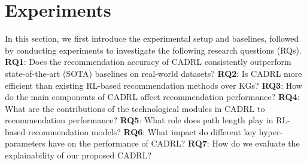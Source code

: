 \documentclass[conference]{IEEEtran}
\begin{document}

\section{Experiments}
In this section, we first introduce the experimental setup and baselines, followed by conducting experiments to investigate the following research questions (RQs). \textbf{RQ1}: Does the recommendation accuracy of CADRL consistently outperform state-of-the-art (SOTA) baselines on real-world datasets? \textbf{RQ2}: Is CADRL more efficient than existing RL-based recommendation methods over KGs? \textbf{RQ3}: How do the main components of CADRL affect recommendation performance?  \textbf{RQ4}: What are the contributions  of the  technological modules in CADRL to recommendation performance? \textbf{RQ5}: What role does path length play in RL-based recommendation models?  \textbf{RQ6}: What impact do different key hyper-parameters have on the performance of CADRL? \textbf{RQ7}: How do we evaluate the explainability of our proposed CADRL?

\end{document}
